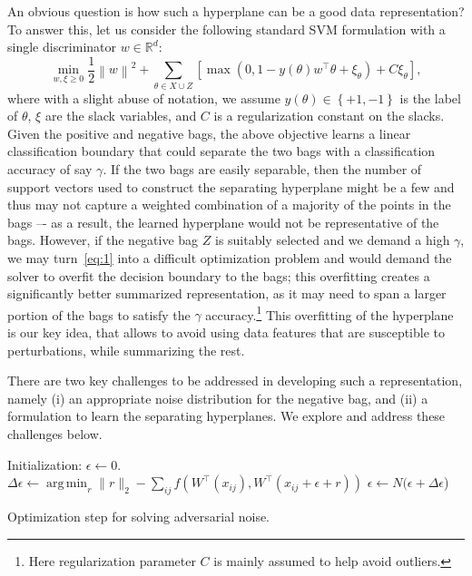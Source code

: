 \documentclass[runningheads]{llncs}
\newcommand{\reals}[1]{\mathbb{R}^{#1}}
\newcommand{\enorm}[1]{\left\|{#1}\right\|}
\newcommand{\set}[1]{\left\{#1\right\}}
\newcommand{\half}{\frac{1}{2}}
\DeclareMathOperator*{\argmin}{arg\,min}
\begin{document}
An obvious question is how such a hyperplane can be a good data representation? To answer this, let us consider the following standard SVM formulation with a single discriminator $w\in\reals{d}$:
\begin{equation}
\min_{w, \xi\geq 0} \half\enorm{w}^2 + \sum_{\theta\in X\cup Z} \left[\max(0, 1- y(\theta) w^\top \theta + \xi_{\theta}) + C \xi_{\theta}\right],
\label{eq:1}
\end{equation}
where with a slight abuse of notation, we assume $y(\theta) \in \set{+1, -1}$ is the label of $\theta$, $\xi$ are the slack variables, and $C$ is a regularization constant on the slacks. Given the positive and negative bags, the above objective learns a linear classification boundary that could separate the two bags with a classification accuracy of say $\gamma$. If the two bags are easily separable, then the number of support vectors used to construct the separating hyperplane might be a few and thus may not capture a weighted combination of a majority of the points in the bags –- as a result, the learned hyperplane would not be representative of the bags. However, if the negative bag $Z$ is suitably selected and we demand a high $\gamma$, we may turn~\eqref{eq:1} into a difficult optimization problem and would demand the solver to overfit the decision boundary to the bags; this overfitting creates a significantly better summarized representation, as it may need to span a larger portion of the bags to satisfy the $\gamma$ accuracy.\footnote{Here regularization parameter $C$ is mainly assumed to help avoid outliers.} This overfitting of the hyperplane is our key idea, that allows to avoid using data features that are susceptible to perturbations, while summarizing the rest.

There are two key challenges to be addressed in developing such a representation, namely (i) an appropriate noise distribution for the negative bag, and (ii) a formulation to learn the separating hyperplanes. We explore and address these challenges below.
\begin{algorithm} [t]
	\SetAlgoLined
	Initialization: $\epsilon\gets 0.$ \\
	 {
		$\Delta \epsilon\gets \argmin_{r} \|r\|_2 - \sum_{ij} f(W^\top (x_{ij}), W^\top (x_{ij}+\epsilon+r))$\;
		$\epsilon \gets N(\epsilon + \Delta \epsilon$)\;
	}
	\caption{Optimization step for solving adversarial noise.}
	\label{alg:1}
\end{algorithm}
\end{document}
